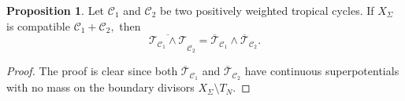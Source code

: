 \documentclass[11pt]{amsart}
\def\Log{{\rm Log}}
\theoremstyle{definition}
\newtheorem{proposition}[theorem]{Proposition}
\newcommand{\R}{\mathbb{R}}
\newcommand{\C}{\mathbb{C}}
\newcommand{\trop}{\mathrm{trop}}
\newcommand{\sD}{\mathscr{D}}
\newcommand{\cC}{\mathcal{C}}
\newcommand{\sT}{\mathscr{T}}
\newcommand{\fq}{\mathfrak{q}}
\begin{document}

\begin{proposition}
   Let $\cC_1$ and $\cC_2$ be two positively weighted tropical cycles. If $X_{\Sigma}$ is compatible  $\cC_1 + \cC_2,$ then
   $$
    \overline{\sT_{\cC_1} \wedge \sT}_{\cC_2} = \overline{\sT}_{\cC_1} \wedge \overline{\sT}_{\cC_2}. 
   $$
   
\end{proposition}
\begin{proof}
The proof is clear since both $\overline{\sT}_{\cC_1}$ and $\overline{\sT}_{\cC_2}$ have continuous superpotentials with no mass on the boundary divisors $X_{\Sigma} \setminus T_N. $ 
\end{proof}
\end{document}
